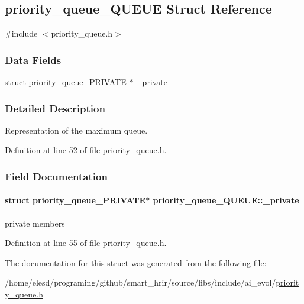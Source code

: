 \hypertarget{a00007}{\subsection{priority\-\_\-queue\-\_\-\-Q\-U\-E\-U\-E Struct Reference}
\label{a00007}
}


{\ttfamily \#include $<$priority\-\_\-queue.\-h$>$}

\subsubsection*{Data Fields}
\begin{DoxyCompactItemize}
\item 
struct priority\-\_\-queue\-\_\-\-P\-R\-I\-V\-A\-T\-E $\ast$ \hyperlink{a00007_a334f4d98ae44012a12e2209cbf5b39fe}{\-\_\-private}
\end{DoxyCompactItemize}


\subsubsection{Detailed Description}
Representation of the maximum queue. 

Definition at line 52 of file priority\-\_\-queue.\-h.



\subsubsection{Field Documentation}
\hypertarget{a00007_a334f4d98ae44012a12e2209cbf5b39fe}{
\paragraph[{\-\_\-private}]{\setlength{\rightskip}{0pt plus 5cm}struct priority\-\_\-queue\-\_\-\-P\-R\-I\-V\-A\-T\-E$\ast$ priority\-\_\-queue\-\_\-\-Q\-U\-E\-U\-E\-::\-\_\-private}}\label{a00007_a334f4d98ae44012a12e2209cbf5b39fe}
private members 

Definition at line 55 of file priority\-\_\-queue.\-h.



The documentation for this struct was generated from the following file\-:\begin{DoxyCompactItemize}
\item 
/home/elesd/programing/github/smart\-\_\-hrir/source/libs/include/ai\-\_\-evol/\hyperlink{a00011}{priority\-\_\-queue.\-h}\end{DoxyCompactItemize}
